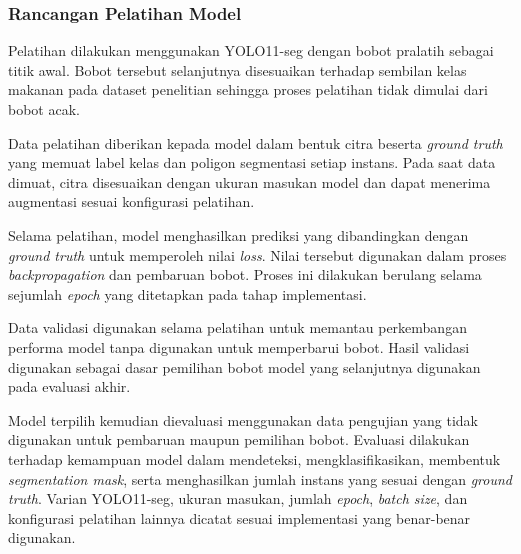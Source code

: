 \subsubsection{Rancangan Pelatihan Model}

Pelatihan dilakukan menggunakan YOLO11-seg dengan bobot pralatih sebagai titik awal. Bobot tersebut selanjutnya disesuaikan terhadap sembilan kelas makanan pada dataset penelitian sehingga proses pelatihan tidak dimulai dari bobot acak.

Data pelatihan diberikan kepada model dalam bentuk citra beserta \textit{ground truth} yang memuat label kelas dan poligon segmentasi setiap instans. Pada saat data dimuat, citra disesuaikan dengan ukuran masukan model dan dapat menerima augmentasi sesuai konfigurasi pelatihan.

Selama pelatihan, model menghasilkan prediksi yang dibandingkan dengan \textit{ground truth} untuk memperoleh nilai \textit{loss}. Nilai tersebut digunakan dalam proses \textit{backpropagation} dan pembaruan bobot. Proses ini dilakukan berulang selama sejumlah \textit{epoch} yang ditetapkan pada tahap implementasi.

Data validasi digunakan selama pelatihan untuk memantau perkembangan performa model tanpa digunakan untuk memperbarui bobot. Hasil validasi digunakan sebagai dasar pemilihan bobot model yang selanjutnya digunakan pada evaluasi akhir.

Model terpilih kemudian dievaluasi menggunakan data pengujian yang tidak digunakan untuk pembaruan maupun pemilihan bobot. Evaluasi dilakukan terhadap kemampuan model dalam mendeteksi, mengklasifikasikan, membentuk \textit{segmentation mask}, serta menghasilkan jumlah instans yang sesuai dengan \textit{ground truth}. Varian YOLO11-seg, ukuran masukan, jumlah \textit{epoch}, \textit{batch size}, dan konfigurasi pelatihan lainnya dicatat sesuai implementasi yang benar-benar digunakan.
